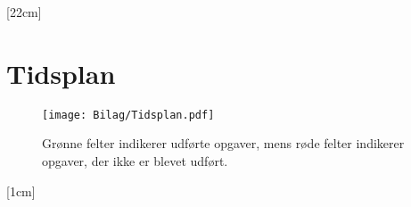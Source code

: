 \eject \pdfpagewidth=420mm \pdfpageheight=297mm
\titlespacing*{\chapter}{1cm}{0cm}{1cm}[22cm]
\chapter{Tidsplan}
\label{tidsplan}

\begin{figure}[H]
	\centering
\vspace{-5mm}
	\texttt{[image: Bilag/Tidsplan.pdf]}
	\caption*{\colorbox{tablegreen}{Grønne} felter indikerer udførte opgaver, mens \colorbox{tablered}{røde} felter indikerer opgaver, der ikke er blevet udført.}
\end{figure}
\label{SidsteSide}
\eject \pdfpagewidth=210mm \pdfpageheight=297mm
\titlespacing*{\chapter}{1cm}{0cm}{1cm}[1cm]